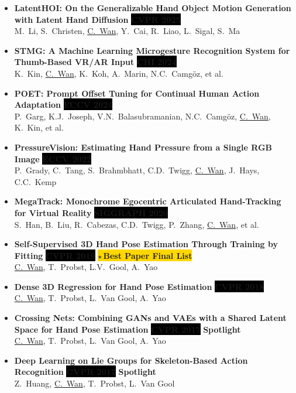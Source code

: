\documentclass[10pt, letterpaper]{article}
\newcommand{\vtag}[1]{\hspace{2pt}%
  \colorbox{black}{\color{white}\fontsize{6.5}{6.5}\selectfont\textsf{\textbf{#1}}}}
\newcommand{\atag}[1]{\hspace{2pt}%
  \colorbox{gold}{\color{white}\fontsize{6.5}{6.5}\selectfont\textsf{\textbf{$\star$\,#1}}}}
\newcommand{\htag}[1]{\hspace{2pt}%
  \colorbox{spotgreen}{\color{white}\fontsize{6.5}{6.5}\selectfont\textsf{\textbf{#1}}}}
\newcommand{\me}[1]{\underline{#1}}
\begin{document}
\begin{itemize}[leftmargin=0pt, itemsep=3pt, parsep=0pt, topsep=1pt, label={}]

  \item {\small\textbf{LatentHOI: On the Generalizable Hand Object Motion Generation with Latent Hand Diffusion}%
    \vtag{CVPR 2025}}\\
    {\footnotesize\color{midgray} M.~Li, S.~Christen, \me{C.~Wan}, Y.~Cai, R.~Liao, L.~Sigal, S.~Ma}

  \item {\small\textbf{STMG: A Machine Learning Microgesture Recognition System for Thumb-Based VR/AR Input}%
    \vtag{CHI 2024}}\\
    {\footnotesize\color{midgray} K.~Kin, \me{C.~Wan}, K.~Koh, A.~Marin, N.C.~Camg\"{o}z, et al.}

  \item {\small\textbf{POET: Prompt Offset Tuning for Continual Human Action Adaptation}%
    \vtag{ECCV 2024}}\\
    {\footnotesize\color{midgray} P.~Garg, K.J.~Joseph, V.N.~Balasubramanian, N.C.~Camg\"{o}z, \me{C.~Wan}, K.~Kin, et al.}

  \item {\small\textbf{PressureVision: Estimating Hand Pressure from a Single RGB Image}%
    \vtag{ECCV 2022}}\\
    {\footnotesize\color{midgray} P.~Grady, C.~Tang, S.~Brahmbhatt, C.D.~Twigg, \me{C.~Wan}, J.~Hays, C.C.~Kemp}

  \item {\small\textbf{MegaTrack: Monochrome Egocentric Articulated Hand-Tracking for Virtual Reality}%
    \vtag{SIGGRAPH 2020}}\\
    {\footnotesize\color{midgray} S.~Han, B.~Liu, R.~Cabezas, C.D.~Twigg, P.~Zhang, \me{C.~Wan}, et al.}

  \item {\small\textbf{Self-Supervised 3D Hand Pose Estimation Through Training by Fitting}%
    \vtag{CVPR 2019}\atag{Best Paper Final List}}\\
    {\footnotesize\color{midgray} \me{C.~Wan}, T.~Probst, L.V.~Gool, A.~Yao}

  \item {\small\textbf{Dense 3D Regression for Hand Pose Estimation}%
    \vtag{CVPR 2018}}\\
    {\footnotesize\color{midgray} \me{C.~Wan}, T.~Probst, L.~Van Gool, A.~Yao}

  \item {\small\textbf{Crossing Nets: Combining GANs and VAEs with a Shared Latent Space for Hand Pose Estimation}%
    \vtag{CVPR 2017}\htag{Spotlight}}\\
    {\footnotesize\color{midgray} \me{C.~Wan}, T.~Probst, L.~Van Gool, A.~Yao}

  \item {\small\textbf{Deep Learning on Lie Groups for Skeleton-Based Action Recognition}%
    \vtag{CVPR 2017}\htag{Spotlight}}\\
    {\footnotesize\color{midgray} Z.~Huang, \me{C.~Wan}, T.~Probst, L.~Van Gool}

\end{itemize}
\end{document}
